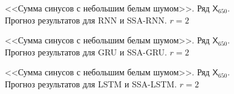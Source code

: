\documentclass[specialist,
               substylefile = spbu.rtx,
               subf,href,colorlinks=true, 12p]{disser}
\begin{document}
\begin{figure}[H]
	\captionsetup{justification=centering}
	\caption{<<Сумма синусов с небольшим белым шумом>>. Ряд $\mathsf{X}_{650}$. Прогноз результатов для RNN и SSA-RNN. $r = 2$}
	\label{edsin0.3r_r2_res_rnn}
\end{figure}

\begin{figure}[H]
	\captionsetup{justification=centering}
	\caption{<<Сумма синусов с небольшим белым шумом>>. Ряд $\mathsf{X}_{650}$. Прогноз результатов для GRU и SSA-GRU. $r = 2$}
	\label{edsin0.3r_r2_res_gru}
\end{figure}

\begin{figure}[H]
	\captionsetup{justification=centering}
	\caption{<<Сумма синусов с небольшим белым шумом>>. Ряд $\mathsf{X}_{650}$. Прогноз результатов для LSTM и SSA-LSTM. $r = 2$}
	\label{edsin0.3r_r2_res_lstm}
\end{figure}
\end{document}
